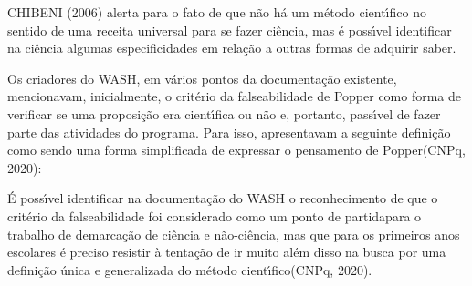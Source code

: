 \documentclass[
12pt,		%
openright,	%
twoside,  %
a4paper,			%
chapter=TITLE,		%
english,			%
french,				%
spanish,			%
brazil				%
]{USPSC-classe/USPSC}
\begin{document}
 CHIBENI (2006) alerta para o fato de que \textquotedbl n\~ao h\'a um m\'etodo cient\'{\i}fico no sentido de uma receita universal para se fazer ci\^encia\textquotedbl , mas \'e poss\'{\i}vel identificar na ci\^encia algumas especificidades em rela\c{c}\~ao a outras formas de adquirir saber.

















Os criadores do WASH, em v\'arios pontos da documenta\c{c}\~ao existente, mencionavam, inicialmente, o crit\'erio da falseabilidade de Popper como forma de verificar se uma proposi\c{c}\~ao era cient\'{\i}fica ou n\~ao e, portanto, pass\'{\i}vel de fazer parte das atividades do programa. Para isso, apresentavam a seguinte defini\c{c}\~ao como sendo uma \textquotedbl forma simplificada de expressar o pensamento de Popper\textquotedbl   (CNPq, 2020):


















\noindent\begin{center}\mbox{\centering{}}\end{center}


\'E poss\'{\i}vel identificar na documenta\c{c}\~ao do WASH o reconhecimento de que o crit\'erio da falseabilidade foi considerado como um \textquotedbl ponto de partida\textquotedbl  para o trabalho de \textquotedbl demarca\c{c}\~ao de ci\^encia e n\~ao-ci\^encia\textquotedbl , mas que para \textquotedbl os primeiros anos escolares \'e preciso resistir \`a tenta\c{c}\~ao de ir muito al\'em disso na busca por uma defini\c{c}\~ao \'unica e generalizada do m\'etodo cient\'{\i}fico\textquotedbl   (CNPq, 2020).
\end{document}
